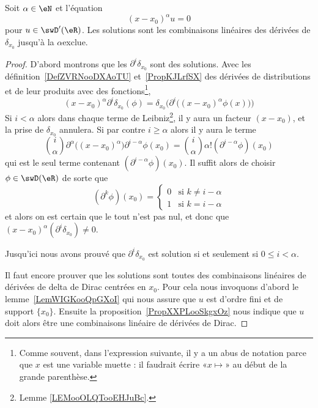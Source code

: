 \begin{theorem}     \label{ThoRDUXooQBlLNb}
	Soit \( \alpha\in \eN\) et l'équation
	\begin{equation}        \label{EqDONTooKPfDWU}
		(x-x_0)^{\alpha}u=0
	\end{equation}
	pour \( u\in\swD'(\eR)\). Les solutions sont les combinaisons linéaires des dérivées de \( \delta_{x_0}\) jusqu'à la \( \alpha\)\ieme exclue.
\end{theorem}

\begin{proof}
	D'abord montrons que les \( \partial^i\delta_{x_0}\) sont des solutions. Avec les définition~\ref{DefZVRNooDXAoTU} et~\ref{PropKJLrfSX} des dérivées de distributions et de leur produits avec des fonctions\footnote{Comme souvent, dans l'expression suivante, il y a un abus de notation parce que \( x\) est une variable muette : il faudrait écrire «\( x\mapsto\)» au début de la grande parenthèse.},
	\begin{equation}
		(x-x_0)^{\alpha}\partial^i\delta_{x_0}(\phi)=\delta_{x_0}\Big( \partial^i\big( (x-x_0)^{\alpha}\phi(x) \big) \Big)
	\end{equation}
	Si \( i<\alpha\) alors dans chaque terme de Leibniz\footnote{Lemme \ref{LEMooOLQTooEHJuBc}.}, il y aura un facteur \( (x-x_0)\), et la prise de \( \delta_{x_0}\) annulera. Si par contre \( i\geq \alpha\) alors il y aura le terme
	\begin{equation}
		\binom{ i }{ \alpha }\partial^{\alpha}\big( (x-x_0)^{\alpha} \big)\partial^{i-\alpha}\phi(x_0)=\binom{ i }{ \alpha }\alpha!(\partial^{i-\alpha}\phi)(x_0)
	\end{equation}
	qui est le seul terme contenant \( (\partial^{i-\alpha}\phi)(x_0)\). Il suffit alors de choisir \( \phi\in\swD(\eR) \) de sorte que
	\begin{equation}
		(\partial^k\phi)(x_0)=\begin{cases}
			0 & \text{si } k\neq i-\alpha \\
			1 & \text{si } k=i-\alpha
		\end{cases}
	\end{equation}
	et alors on est certain que le tout n'est pas nul, et donc que \( (x-x_0)^{\alpha}(\partial^i\delta_{x_0})\neq 0\).

	Jusqu'ici nous avons prouvé que \( \partial^i\delta_{x_0}\) est solution si et seulement si \( 0\leq i<\alpha\).

	Il faut encore prouver que les solutions sont toutes des combinaisons linéaires de dérivées de delta de Dirac centrées en \( x_0\). Pour cela nous invoquons d'abord le lemme~\ref{LemWIGKooQpGXoI} qui nous assure que \( u\) est d'ordre fini et de support \( \{ x_0 \}\). Ensuite la proposition~\ref{PropXXPLooSkgxOz} nous indique que \( u\) doit alors être une combinaisons linéaire de dérivées de Dirac.
\end{proof}

